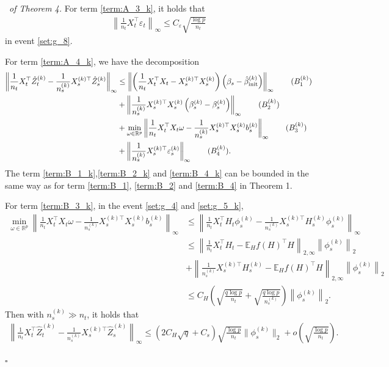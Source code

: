 \documentclass[12pt]{article}
\newenvironment{pf}{{\noindent \it Proof}\ }{\hfill $\square$\par}
\begin{document}
\begin{pf}{\it of Theorem 4. }
    For term \ref{term:A_3_k}, it holds that
    \begin{align*}
        \left\|\frac{1}{n_t}X_t^\top \varepsilon_t \right\|_{\infty} \le C_\varepsilon\sqrt{\frac{\log p}{n_t}}
    \end{align*}
    in event \ref{set:g_8}. 
    
    For term \ref{term:A_4_k}, we have the decomposition
    \begin{align}
       \left\|\frac{1}{n_t}X_t^\top \hat{Z}^{(k)}_t -  \frac{1}{n_s^{(k)}}X_s^{(k)\top}\hat{Z}_s^{(k)}\right\|_{\infty} &\le 
        \left\|\left(\frac{1}{n_t}X_t^\top X_t  -X_s^{(k)\top}X_s^{(k)} \right)\left(\beta_s - \hat{\beta}_{\text{init}}^{(k)}\right)\right\|_{\infty}
        \label{term:B_1_k} \tag{$B_1^{(k)}$}
        \\  & + 
        \left\| \frac{1}{n_s^{(k)}}X_s^{(k)\top}X_s^{(k)} \left(\beta_s^{(k)} - \beta_s^{(k)}\right) \right\|_{\infty}
        \label{term:B_2_k} \tag{$B_2^{(k)}$}
        \\ & + 
        \min_{\omega \in \mathbb{R}^p} \left\|\frac{1}{n_t}X_t^\top X_t \omega - \frac{1}{n_s^{(k)}}X_s^{(k)\top}X_s^{(k)} b_s^{(k)}\right\|_{\infty}
        \label{term:B_3_k} \tag{$B_3^{(k)}$}
        \\ & + \left\|\frac{1}{n_s^{(k)}} X_s^{(k)\top}\varepsilon_s^{(k)}\right\|_{\infty}
        \label{term:B_4_k} \tag{$B_4^{(k)}$}.
    \end{align}
    The term \ref{term:B_1_k},\ref{term:B_2_k} and \ref{term:B_4_k} can be bounded in the same way as for term \ref{term:B_1}, \ref{term:B_2} and \ref{term:B_4}  in Theorem 1. 
    
    For term \ref{term:B_3_k}, in the event \ref{set:g_4} and \ref{set:g_5_k}, 
    \begin{align*}
        \min_{\omega \in \mathbb{R}^p} \left\|\frac{1}{n_t}X_t^\top X_t \omega - \frac{1}{n_s^{(k)}}X_s^{(k)\top}X_s^{(k)} b_s^{(k)}\right\|_{\infty} & \le 
        \left\|\frac{1}{n_t}X_t^\top H_t \phi_s^{(k)} - \frac{1}{n_s^{(k)}}X_s^{(k)\top}H_s^{(k)} \phi_s^{(k)}\right\|_{\infty}\\&\le 
        \left\|\frac{1}{n_t}X_t^\top H_t  -\mathbb{E}_H f(H)^\top H \right\|_{2,\infty}\left\|\phi_s^{(k)}\right\|_{2}\\&+
        \left\|\frac{1}{n_s^{(k)}}X_s^{(k)\top}H_s^{(k)}-\mathbb{E}_H f(H)^\top H  \right\|_{2,\infty}\left\|\phi_s^{(k)}\right\|_{2}\\& \le
        C_H\left(\sqrt{\frac{q\log p}{n_t}} + \sqrt{\frac{q\log p}{n_s^{(k)}}}\right)\left\|\phi_s^{(k)}\right\|_2. 
    \end{align*}
   Then with $n_s^{(k)}\gg n_t$, it holds that
    \begin{align*}
         \left\|\frac{1}{n_t}X_t^\top \hat{Z}^{(k)}_t -  \frac{1}{n_s^{(k)}}X_s^{(k)\top}\hat{Z}_s^{(k)}\right\|_{\infty} \le (2C_H\sqrt{q} + C_s)\sqrt{\frac{\log p }{n_t}}\|\phi_s^{(k)}\|_2 + o\left(\sqrt{\frac{\log p}{n_t}}\right).
    \end{align*}


\end{pf}
\end{document}

